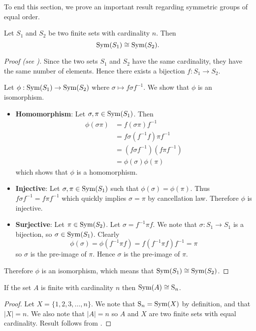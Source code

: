 To end this section, we prove an important result regarding symmetric groups of equal order.
\begin{theorem}\label{thrm-symmetric-groups-of-same-order-are-isomorphic}
    Let $S_1$ and $S_2$ be two finite sets with cardinality $n$. Then
    \[
        \mathrm{Sym}(S_1) \cong \mathrm{Sym}(S_2).
    \]
\end{theorem}
\begin{proof}[Proof (see {\cite[Proof 2]{proofwiki_symmetric-group-of-same-order-are-isomorphic}})]
    Since the two sets $S_1$ and $S_2$ have the same cardinality, they have the same number of elements. Hence there exists a bijection $f: S_1 \to S_2$.

    Let $\phi: \mathrm{Sym}(S_1) \to \mathrm{Sym}(S_2)$ where $\sigma \mapsto f\sigma f^{-1}$. We show that $\phi$ is an isomorphism.
    \begin{itemize}
        \item \textbf{Homomorphism}: Let $\sigma, \pi \in \mathrm{Sym}(S_1)$. Then
        \begin{align*}
            \phi(\sigma\pi) &= f(\sigma\pi)f^{-1}\\
            &= f\sigma(f^{-1}f)\pi f^{-1}\\
            &= (f\sigma f^{-1})(f\pi f^{-1})\\
            &= \phi(\sigma)\phi(\pi)
        \end{align*}
        which shows that $\phi$ is a homomorphism.

        \item \textbf{Injective}: Let $\sigma, \pi \in \mathrm{Sym}(S_1)$ such that $\phi(\sigma) = \phi(\pi)$. Thus $f\sigma f^{-1} = f\pi f^{-1}$ which quickly implies $\sigma = \pi$ by cancellation law. Therefore $\phi$ is injective.
        
        \item \textbf{Surjective}: Let $\pi \in \mathrm{Sym}(S_2)$. Let $\sigma = f^{-1}\pi f$. We note that $\sigma: S_1 \to S_1$ is a bijection, so $\sigma \in \mathrm{Sym}(S_1)$. Clearly
        \[
            \phi(\sigma) = \phi(f^{-1}\pi f) = f(f^{-1}\pi f)f^{-1} = \pi
        \]
        so $\sigma$ is the pre-image of $\pi$. Hence $\sigma$ is the pre-image of $\pi$.
    \end{itemize}
    Therefore $\phi$ is an isomorphism, which means that $\mathrm{Sym}(S_1) \cong \mathrm{Sym}(S_2)$.
\end{proof}

\begin{corollary}\label{corollary-symmetric-group-of-finite-order}
    If the set $A$ is finite with cardinality $n$ then $\mathrm{Sym}(A) \cong \mathrm{S}_{n}$.
\end{corollary}
\begin{proof}
    Let $X = \{1, 2, 3, \dots, n\}$. We note that $\mathrm{S}_{n} = \mathrm{Sym}(X)$ by definition, and that $|X| = n$. We also note that $|A| = n$ so $A$ and $X$ are two finite sets with equal cardinality. Result follows from .
\end{proof}

